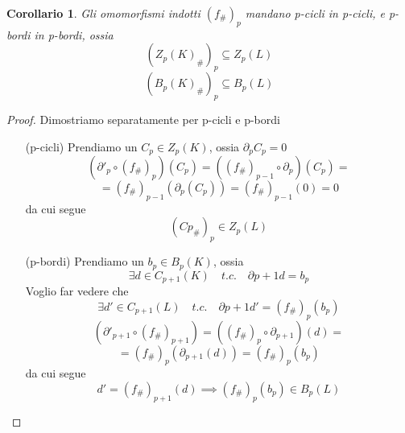 \documentclass[a4paper]{report}
\newtheorem{corollary}{Corollario}
\newcommand{\shrp}[1]{\ensuremath{({#1}_\#)_p}}
\begin{document}
\begin{corollary}
    Gli omomorfismi indotti $\shrp{f}$ mandano p-cicli in p-cicli, e p-bordi in p-bordi, ossia
    \[
        \shrp{Z_p(K)}\subseteq Z_p(L)    
    \]
    \[
        \shrp{B_p(K)}\subseteq B_p(L)    
    \]
\end{corollary}
\begin{proof}
    Dimostriamo separatamente per p-cicli e p-bordi
    \begin{itemize}
        \item[(p-cicli)] Prendiamo un $C_p\in Z_p(K)$, ossia $\partial_pC_p=0$
        \[
            \left(\partial'_p\circ\shrp{f}\right)(C_p)=\left((f_\#)_{p-1}\circ\partial_p\right)(C_p)=
        \]
        \[
            =(f_\#)_{p-1}(\partial_p(C_p))=(f_\#)_{p-1}(0)=0    
        \]
        da cui segue
        \[
            \shrp{Cp}\in Z_p(L)    
        \]
        \item[(p-bordi)] Prendiamo un $b_p\in B_p(K)$, ossia
        \[
            \exists d\in C_{p+1}(K)\quad t.c.\quad \partial{p+1}d=b_p    
        \]
        Voglio far vedere che
        \[
            \exists d'\in C_{p+1}(L)\quad t.c.\quad \partial{p+1}d'=\shrp{f}(b_p) 
        \]
        \[
            \left(\partial'_{p+1}\circ(f_\#)_{p+1}\right)=\left(\shrp{f}\circ\partial_{p+1}\right)(d)=
        \]
        \[
            =\shrp{f}(\partial_{p+1}(d))=\shrp{f}(b_p)    
        \]
        da cui segue
        \[
            d'=(f_\#)_{p+1}(d)\implies (f_\#)_p(b_p)\in B_p(L)    
        \]
    \end{itemize}
\end{proof}
\end{document}
